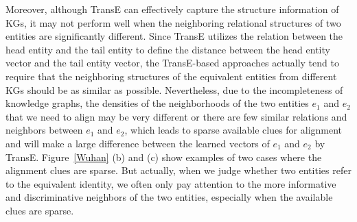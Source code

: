 	Moreover, although TransE can effectively capture the structure information of KGs, it may not perform well when the neighboring relational structures of two entities are significantly different. Since TransE utilizes the relation between the head entity and the tail entity to define the distance between the head entity vector and the tail entity vector, the TransE-based approaches actually tend to require that the neighboring structures of the equivalent entities from different KGs should be as similar as possible. Nevertheless, due to the incompleteness of knowledge graphs, the densities of the neighborhoods of the two entities $e_1$ and $e_2$ that we need to align may be very different or there are few similar relations and neighbors between $e_1$ and $e_2$, which leads to sparse available clues for alignment and will make a large difference between the learned vectors of $e_1$ and $e_2$ by TransE. Figure~\ref{Wuhan} (b) and (c) show examples of two cases where the alignment clues are sparse. But actually, when we judge whether two entities refer to the equivalent identity, we often only pay attention to the more informative and discriminative neighbors of the two entities, especially when the available clues are sparse.
